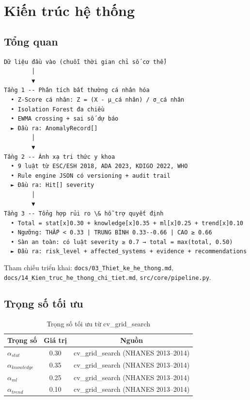 \documentclass[13pt,a4paper]{article}
\begin{document}
\section{Kiến trúc hệ thống}

\subsection{Tổng quan}

\begin{verbatim}
Dữ liệu đầu vào (chuỗi thời gian chỉ số cơ thể)
        │
        ▼
Tầng 1 -- Phân tích bất thường cá nhân hóa
  • Z-Score cá nhân: Z = (X - μ_cá nhân) / σ_cá nhân
  • Isolation Forest đa chiều
  • EWMA crossing + sai số dự báo
  ► Đầu ra: AnomalyRecord[]
        │
        ▼
Tầng 2 -- Ánh xạ tri thức y khoa
  • 9 luật từ ESC/ESH 2018, ADA 2023, KDIGO 2022, WHO
  • Rule engine JSON có versioning + audit trail
  ► Đầu ra: Hit[] severity
        │
        ▼
Tầng 3 -- Tổng hợp rủi ro \& hỗ trợ quyết định
  • Total = stat[x]0.30 + knowledge[x]0.35 + ml[x]0.25 + trend[x]0.10
  • Ngưỡng: THẤP < 0.33 | TRUNG BÌNH 0.33--0.66 | CAO ≥ 0.66
  • Sàn an toàn: có luật severity ≥ 0.7 → total = max(total, 0.50)
  ► Đầu ra: risk_level + affected_systems + evidence + recommendations
\end{verbatim}

Tham chiếu triển khai: \texttt{docs/03\_Thiet\_ke\_he\_thong.md}, \texttt{docs/14\_Kien\_truc\_he\_thong\_chi\_tiet.md}, \texttt{src/core/pipeline.py}.

\subsection{Trọng số tối ưu}

\begin{table}[H]
\centering
\caption{Trọng số tối ưu từ cv\_grid\_search}
\label{tab:weights}
\begin{tabular}{lcc}
\toprule
Trọng số & Giá trị & Nguồn \\
\midrule
$\alpha_{stat}$ & 0.30 & cv\_grid\_search (NHANES 2013--2014) \\
$\alpha_{knowledge}$ & 0.35 & cv\_grid\_search (NHANES 2013--2014) \\
$\alpha_{ml}$ & 0.25 & cv\_grid\_search (NHANES 2013--2014) \\
$\alpha_{trend}$ & 0.10 & cv\_grid\_search (NHANES 2013--2014) \\
\bottomrule
\end{tabular}
\end{table}
\end{document}

